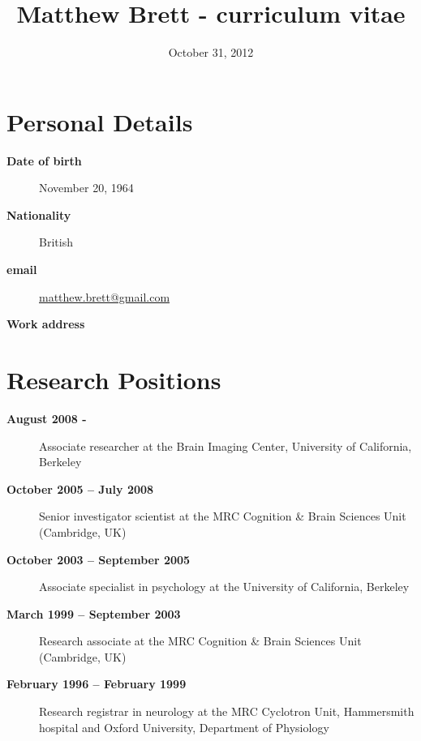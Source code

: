 \documentclass[letterpaper,11pt,openany]{sphinxhowto}
\title{Matthew Brett - curriculum vitae}
\date{October 31, 2012}
\author{}
\renewcommand\tableofcontents{}
\begin{document}
\maketitle
\tableofcontents
{}\label{research/cv_wrapper::doc}



\section{Personal Details}
\label{research/cv_wrapper:personal-details}\label{research/cv_wrapper:cv}\label{research/cv_wrapper:curriculum-vitae}\begin{description}
\item[{\textbf{Date of birth}}] \leavevmode
November 20, 1964

\item[{\textbf{Nationality}}] \leavevmode
British

\item[{\textbf{email}}] \leavevmode
\href{mailto:matthew.brett@gmail.com}{matthew.brett@gmail.com}

\item[{\textbf{Work address}}] \leavevmode
{}

\end{description}


\section{Research Positions}
\label{research/cv_wrapper:research-positions}\begin{description}
\item[{\textbf{August 2008 -}}] \leavevmode
Associate researcher at the Brain Imaging Center, University of California, Berkeley

\item[{\textbf{October 2005 – July 2008}}] \leavevmode
Senior investigator scientist at the MRC Cognition \& Brain Sciences Unit
(Cambridge, UK)

\item[{\textbf{October 2003 – September 2005}}] \leavevmode
Associate specialist in psychology at the University of California, Berkeley

\item[{\textbf{March 1999 – September 2003}}] \leavevmode
Research associate at the MRC Cognition \& Brain Sciences Unit (Cambridge, UK)

\item[{\textbf{February 1996 – February 1999}}] \leavevmode
Research registrar in neurology at the MRC Cyclotron Unit, Hammersmith
hospital and Oxford University, Department of Physiology

\end{description}
\end{document}

